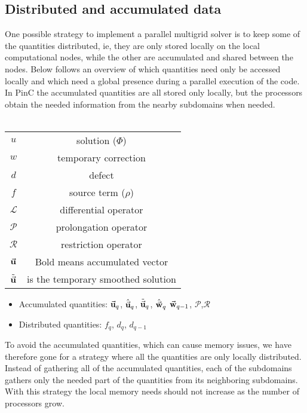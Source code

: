 	\subsection{Distributed and accumulated data}
		One possible strategy to implement a parallel multigrid solver is to keep
		some of the quantities distributed, ie, they are only stored locally
		on the local computational nodes, while the other are accumulated and
		shared between the nodes. Below follows an overview of which quantities
		need only be accessed locally and which need a global presence
		during a parallel execution of the code. In PinC the accumulated quantities
 		are all stored only locally, but the processors obtain the needed information
		from the nearby subdomains when needed.
	\\	\\
		\begin{tabular} {c c}
			\(u\) & solution (\(\Phi\))
			\\
			\(w\) & temporary correction
			\\
			\(d\) & defect \\
			\(f\) & source term (\(\rho\)) \\
			\(\mathcal{L}\) & differential operator \\
			\(\mathcal{P}\) & prolongation operator \\
			\(\mathcal{R}\) & restriction operator \\
			 \( \va{u}\) & Bold means accumulated vector \\
			\( \tilde{\va{ u }} \) & is the temporary smoothed solution
		\end{tabular}

		\begin{itemize}
			\item Accumulated quantities:	\(\va{u}_q\), \( \hat{\va{u}}_q \), \(\tilde{\va{u}}_q\), \(\hat{\va{w}}_q\) \(\va{w}_{q-1}\), \(\mathcal{P}\),\(\mathcal{R}\)
			\item Distributed quantities:  \( f_q \), \(d_q\), \(d_{q-1}\)
		\end{itemize}

		To avoid the accumulated quantities, which can cause memory issues, we have therefore
		gone for a strategy where all the quantities are only locally distributed.
		Instead of gathering all of the accumulated quantities, each of the subdomains
		gathers only the needed part of the quantities from its neighboring subdomains.
		With this strategy the local memory needs should not increase as the number
		of processors grow.

